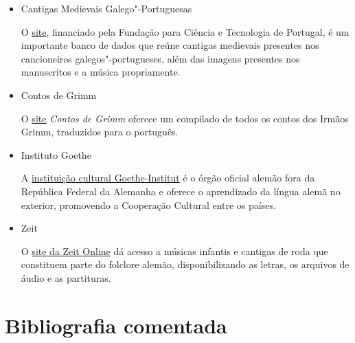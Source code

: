 \documentclass[12pt]{extarticle}
\begin{document}
\begin{itemize}
\item Cantigas Medievais Galego"-Portuguesas

O \href{https://cantigas.fcsh.unl.pt/index.asp}{site}, financiado pela Fundação para Ciência e Tecnologia de Portugal, é um importante banco de dados
que reúne cantigas medievais presentes nos cancioneiros galegos"-portugueses, além das imagens presentes 
nos manuscritos e a música propriamente.

\item Contos de Grimm

O \href{https://www.grimmstories.com/pt/grimm_contos/index}{site} \emph{Contos de Grimm} oferece um compilado de todos os contos dos Irmãos Grimm, traduzidos para o português.

\item Instituto Goethe

A \href{http://www.goethe.de/rio}{instituição cultural Goethe-Institut} é o órgão oficial alemão fora da República Federal da Alemanha e 
oferece o aprendizado da língua alemã no exterior, promovendo a Cooperação Cultural entre os países.

\item Zeit

O \href{https://www.zeit.de/serie/kinderlieder?fbclid=IwAR0YTdmrrM24sDcmak__AxviJPibv0_Bxf9sx9XkX7g-4VxcKbNbRbVPrew&utm_referrer=https%3A%2F%2Fl.facebook.com%2F}{site da Zeit Online} dá acesso a músicas infantis e cantigas de roda que constituem parte do folclore alemão, 
disponibilizando as letras, os arquivos de áudio e as partituras.
\end{itemize}


\section{Bibliografia comentada}
\end{document}
